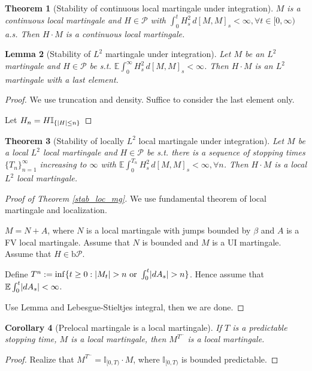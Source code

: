 \documentclass[openany,oneside]{book}
\newtheorem{thm}{Theorem}[section]
\newtheorem{lem}[thm]{Lemma}
\newtheorem{cor}[thm]{Corollary}
\theoremstyle{definition}
\theoremstyle{remark}
\newcommand{\E}{\mathbb{E}} %
\newcommand{\I}{\mathbb{I}} %
\DeclarePairedDelimiter{\abs}{\lvert}{\rvert} %
\newcommand{\pred}{\mathcal{P}} %
\newcommand{\bP}{\mathrm{b}\pred} %
\begin{document}
\begin{thm}[Stability of continuous local martingale under integration]
$M$ is a continuous local martingale and $H\in \pred$ with $\int_0^t H^2_s \,d [M,M]_s < \infty, \forall t\in[0,\infty)$ a.s. Then $H\cdot M$ is a continuous local martingale.
\end{thm}

\begin{lem}[Stability of $L^2$ martingale under integration]
Let $M$ be an $L^2$ martingale and $H\in\pred$ be s.t. $\E\int_0^\infty H^2_s \,d [M,M]_s < \infty$. Then $H\cdot M$ is an $L^2$ martingale with a last element.
\end{lem}
\begin{proof}
We use truncation and density. Suffice to consider the last element only.
\par
Let $H_n = H \I_{\{\abs{H} \le n\}}$
\end{proof}

\begin{thm}[Stability of locally $L^2$ local martingale under integration]
Let $M$ be a local $L^2$ local martingale and $H\in\pred$ be s.t. there is a sequence of stopping times $\{T_n\}_{n=1}^\infty$ increasing to $\infty$ with $\E\int_0^{T_n} H^2_s \,d [M,M]_s < \infty, \forall n$. Then $H\cdot M$ is a local $L^2$ local martingale.
\end{thm}

\begin{proof}[Proof of Theorem \ref{stab_loc_mg}]
We use fundamental theorem of local martingale and localization.
\par
$M=N+A$, where $N$ is a local martingale with jumps bounded by $\beta$ and $A$ is a FV local martingale. Assume that $N$ is bounded and $M$ is a UI martingale. Assume that $H\in \bP$.
\par
Define $T^n:=\inf\{t\ge 0 : \abs{M_t} > n \textrm{ or } \int_0^t \abs{d A_s} > n \}$. Hence assume that $\E \int_0^t \abs{d A_s} < \infty$.
\par
Use Lemma and Lebesgue-Stieltjes integral, then we are done.
\end{proof}

\begin{cor}[Prelocal martingale is a local martingale]
If $T$ is a predictable stopping time, $M$ is a local martingale, then $M^{T^-}$ is a local martingale.
\end{cor}
\begin{proof}
Realize that $M^{T^-} = \I_{[0,T)}\cdot M$, where $\I_{[0,T)}$ is bounded predictable.
\end{proof}
\end{document}
